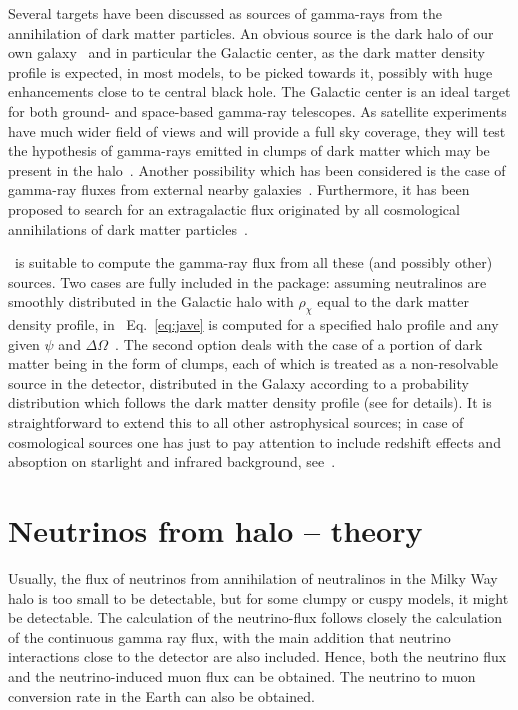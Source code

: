 Several targets have been discussed as sources of gamma-rays from the
annihilation of dark matter particles. An obvious source is the dark
halo of our own galaxy~\cite{galga} and in particular the Galactic center,
as the dark matter density profile is expected, in most models, to be 
picked towards it, possibly with huge enhancements close to te central 
black hole. The Galactic center is an ideal target for both ground-
and space-based gamma-ray telescopes. As satellite experiments have 
much wider field of views and will provide a full sky coverage,
they will test the hypothesis of gamma-rays emitted in clumps of dark 
matter which may be present in the 
halo~\cite{clumpyga,gahalo,clumpy,clumpybeg}. 
Another possibility which has been considered is the case of 
gamma-ray fluxes from external nearby galaxies~\cite{extergal}. 
Furthermore, it has 
been proposed to search for an extragalactic flux originated by all 
cosmological annihilations of dark matter 
particles~\cite{extragal,extragalbeu}.

\ds\ is suitable to compute the gamma-ray flux from all these (and possibly 
other) sources. Two cases are fully included in the package:
assuming neutralinos are smoothly distributed in the Galactic halo
with $\rho_{\chi}$ equal to the dark matter density profile, in 
\ds\ Eq.~\ref{eq:jave} is computed for a specified halo profile and 
any given $\psi$ and $\Delta\Omega$~\cite{lpj}. 
The second option deals with the
case of a portion of dark matter being in the form of clumps, each of
which is treated as a non-resolvable source in the detector, distributed
in the Galaxy according to a probability distribution which
follows the dark matter density profile (see \cite{clumpy}
for details). It is straightforward to extend this to all other 
astrophysical sources; in case of cosmological sources one has just 
to pay attention to include redshift effects and absoption on starlight 
and infrared background, see~\cite{extragalbeu}.



\section{Neutrinos from halo -- theory}

Usually, the flux of neutrinos from annihilation of neutralinos in
the Milky Way halo is too small to be detectable, but for some clumpy
or cuspy models, it might be detectable. The calculation of the
neutrino-flux follows closely the calculation of the continuous gamma
ray flux, with the main addition that neutrino interactions close to
the detector are also included. Hence, both the neutrino flux and the
neutrino-induced muon flux can be obtained. The neutrino to muon
conversion rate in the Earth can also be obtained.
